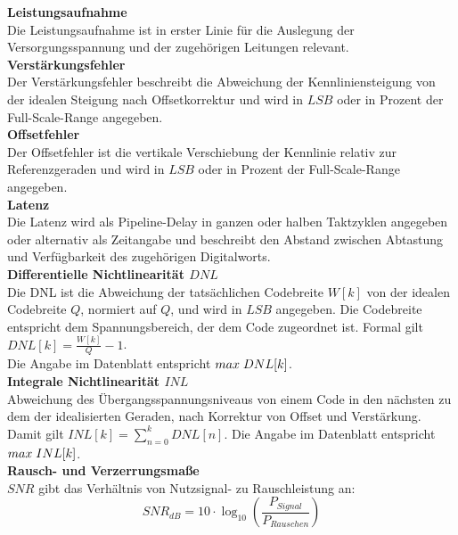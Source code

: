 \documentclass[a4paper, portrait, 12pt]{scrartcl} %
\begin{document}
\textbf{Leistungsaufnahme}\\
Die Leistungsaufnahme ist in erster Linie für die Auslegung der Versorgungsspannung und der zugehörigen Leitungen relevant.\\

\textbf{Verstärkungsfehler}\\
Der Verstärkungsfehler beschreibt die Abweichung der Kennliniensteigung von der idealen Steigung nach Offsetkorrektur und wird in $LSB$ oder in Prozent der Full-Scale-Range angegeben.\\

\textbf{Offsetfehler}\\
Der Offsetfehler ist die vertikale Verschiebung der Kennlinie relativ zur Referenzgeraden und wird in $LSB$ oder in Prozent der Full-Scale-Range angegeben.\\

\textbf{Latenz}\\
Die Latenz wird als Pipeline-Delay in ganzen oder halben Taktzyklen angegeben oder alternativ als Zeitangabe und beschreibt den Abstand zwischen Abtastung und Verfügbarkeit des zugehörigen Digitalworts.\\

\textbf{Differentielle Nichtlinearität $DNL$}\\
Die DNL ist die Abweichung der tatsächlichen Codebreite $W[k]$ von der idealen Codebreite $Q$, normiert auf $Q$, und wird in $LSB$ angegeben. Die Codebreite entspricht dem Spannungsbereich, der dem Code zugeordnet ist. Formal gilt $DNL[k]=\frac{W[k]}{Q}-1$.\\
Die Angabe im Datenblatt entspricht $max\hspace{0.1cm}DNL[k]$.\\

\textbf{Integrale Nichtlinearität $INL$}\\
Abweichung des Übergangsspannungsniveaus von einem Code in den nächsten zu dem der idealisierten Geraden, nach Korrektur von Offset und Verstärkung.\\
Damit gilt $INL[k]=\sum_{n=0}^kDNL[n]$. Die Angabe im Datenblatt entspricht $max\hspace{0.1cm}INL[k]$.\\

\textbf{Rausch- und Verzerrungsmaße}\\
\textbf{$SNR$} gibt das Verhältnis von Nutzsignal- zu Rauschleistung an:
\begin{equation}
	SNR_{dB}=10\cdot \log_{10}\left( \frac{P_{Signal}}{P_{Rauschen}}\right)
\end{equation}
\end{document}
